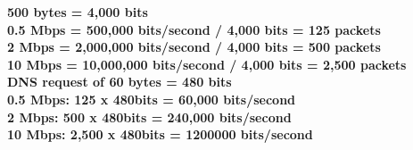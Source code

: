 \documentclass[12pt]{article}
\begin{document}
\begin{enumerate}
\textbf{500 bytes = 4,000 bits} \\
\textbf{0.5 Mbps = 500,000 bits/second / 4,000 bits = 125 packets } \\
\textbf{2 Mbps = 2,000,000 bits/second / 4,000 bits = 500 packets } \\
\textbf{10 Mbps = 10,000,000 bits/second / 4,000 bits = 2,500 packets } \\

\textbf{DNS request of 60 bytes = 480 bits}\\
\textbf{0.5 Mbps: 125 x 480bits = 60,000 bits/second} \\
\textbf{2 Mbps: 500 x 480bits = 240,000 bits/second} \\
\textbf{10 Mbps: 2,500 x 480bits = 1200000 bits/second } \\




\end{enumerate}
\end{document}
